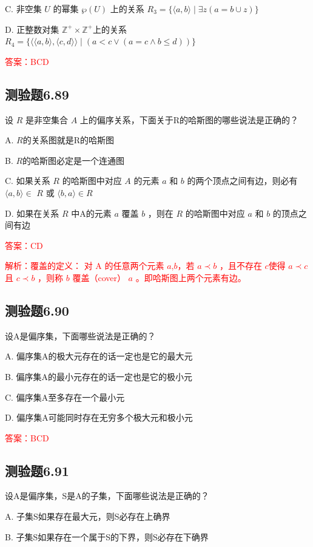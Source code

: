 \documentclass[UTF8, heading=true]{ctexart}
\begin{document}
C. 非空集 $U$ 的幂集 $\wp(U)$ 上的关系 $R_3=\{\langle a, b\rangle \mid \exists z(a=b \cup z)\}$

D. 正整数对集 $\mathbb{Z}^{+} \times \mathbb{Z}^{+}$上的关系 $R_4=\{\langle\langle a, b\rangle,\langle c, d\rangle\rangle \mid(a<c \vee(a=c \wedge b \leq d))\}$


\textcolor{red}{答案：BCD}

\subsection{测验题6.89}

设 $R$ 是非空集合 $A$ 上的偏序关系，下面关于R的哈斯图的哪些说法是正确的？

A. $R$的关系图就是R的哈斯图

B. $R$的哈斯图必定是一个连通图

C. 如果关系 $R$ 的哈斯图中对应 $A$ 的元素 $a$ 和 $b$ 的两个顶点之间有边，则必有 $\langle a, b\rangle \in$ $R$ 或 $\langle b, a\rangle \in R$

D. 如果在关系 $R$ 中A的元素 $a$ 覆盖 $b$ ，则在 $R$ 的哈斯图中对应 $a$ 和 $b$ 的顶点之间有边

\textcolor{red}{答案：CD}

\textcolor{red}{解析：覆盖的定义：
对 A 的任意两个元素 $a$,$ b $，若 $a \prec b$ ，且不存在 $c $使得 $a \prec c$ 且 $c \prec b$ ，则称 $b$ 覆盖（cover） $a$ 。即哈斯图上两个元素有边。}


\subsection{测验题6.90}

设A是偏序集，下面哪些说法是正确的？

A. 偏序集A的极大元存在的话一定也是它的最大元

B. 偏序集A的最小元存在的话一定也是它的极小元

C. 偏序集A至多存在一个最小元

D. 偏序集A可能同时存在无穷多个极大元和极小元

\textcolor{red}{答案：BCD}

\subsection{测验题6.91}

设A是偏序集，S是A的子集，下面哪些说法是正确的？

A. 子集S如果存在最大元，则S必存在上确界

B. 子集S如果存在一个属于S的下界，则S必存在下确界
\end{document}
